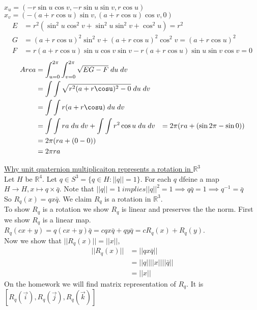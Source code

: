 \documentclass[12pt,letterpaper]{hmcpset}
\begin{document}
$x_u = (-r \sin u \cos v, -r \sin u \sin v, r \cos u)$\\
$x_v = (-(a + r \cos u) \sin v, (a + r \cos u) \cos v, 0)$ \\
\begin{align*}
  E &= r^2 (\sin^2 u \cos^2 v + \sin^2 u \sin^2 v + \cos^2 u) = r^2 \\
  G &= (a + r \cos u)^2 \sin^2 v + (a + r \cos u)^2 \cos^2 v = (a + r \cos u)^2 \\
  F &= r(a + r \cos u) \sin u \cos v \sin v - r (a + r \cos u) \sin u \sin v \cos v = 0
\end{align*}
\begin{align*}
  Area &= \int_{u=0}^{2\pi}\int_{v=0}^{2\pi} \sqrt{EG - F}\;du\;dv \\
       &= \int\int \sqrt{r^2(a + r \cosu)^2 - 0}\; du\; dv \\
       &= \int\int r(a + r \cosu)\;du\;dv \\
       &= \int\int ra\;du\;dv + \int\int r^2 \cos u\;du\;dv
       &= 2\pi(ra + (\sin 2\pi - \sin 0)) \\
       &= 2\pi(ra + (0 - 0)) \\
       &= 2\pi ra 
  \end{align*}
  

\underline{Why unit quaternion multiplicaiton represents a rotation in
  $\mathbb{R}^3$} \\

Let $H$ be $\mathbb{R}^4$.
Let $q \in S^3 = \{ q \in H : ||q||=1 \}$. For each $q$ dfeine a map $H \rightarrow H, x \mapsto q \times
\bar{q}$.
Note that $||q|| = 1\ implies ||q||^2 = 1 \implies q\bar{q} = 1 \implies q^{-1}
= \bar{q}$ \\
So $R_q(x) = q x \bar{q}$.
We claim $R_q$ is a rotation in $\mathbb{R}^3$. \\
To show $R_q$ is a rotation we show $R_q$ is linear and preserves the
the norm. First we show $R_q$ is a linear map. $R_q(cx + y) = q(cx + y)\bar{q} =
cqx\bar{q} + qy\bar{q} = cR_q(x) + R_q(y)$.\\
Now we show that $||R_q(x)|| = ||x||$,
\begin{align*}
  ||R_q(x)|| &= ||qx\bar{q}|| \\
             &= ||q||||x||||\bar{q}|| \\
             &= ||x||
\end{align*}
On the homework we will find matrix representation of $R_q$. It is
$[R_q(\vec{i}), R_q(\vec{j}), R_q(\vec{k})]$
\end{document}
